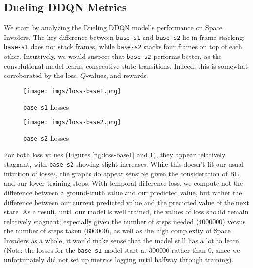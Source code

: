 \documentclass{article} %
\begin{document}
\subsection{Dueling DDQN Metrics}

We start by analyzing the Dueling DDQN model's performance on Space Invaders. The key difference
between \texttt{base-s1} and \texttt{base-s2} lie in frame stacking; \texttt{base-s1} does not stack
frames, while \texttt{base-s2} stacks four frames on top of each other. Intuitively, we would
suspect that \texttt{base-s2} performs better, as the convolutional model learns consecutive state
transitions. Indeed, this is somewhat corroborated by the loss, $Q$-values, and rewards.

\begin{figure}
    \centering
    \begin{minipage}{0.45\textwidth}
        \centering
        \texttt{[image: imgs/loss-base1.png]} %
        \caption{\texttt{base-s1} Losses}
        \label{fig:loss-base1}
    \end{minipage}\hfill
    \begin{minipage}{0.45\textwidth}
        \centering
        \texttt{[image: imgs/loss-base2.png]} %
        \caption{\texttt{base-s2} Losses}
        \label{fig:loss-base2}
    \end{minipage}
\end{figure}

For both loss values (Figures \ref{fig:loss-base1} and \ref{fig:loss-base2}), they appear relatively
stagnant, with \texttt{base-s2} showing slight increases. While this doesn't fit our usual intuition
of losses, the graphs do appear sensible given the consideration of RL and our lower training steps.
With temporal-difference loss, we compute not the difference between a ground-truth value and our
predicted value, but rather the difference between our current predicted value and the predicted
value of the next state. As a result, until our model is well trained, the values of loss should
remain relatively stagnant; especially given the number of steps needed ($4000000$) versus the
number of steps taken ($600000$), as well as the high complexity of Space Invaders as a whole, it
would make sense that the model still has a lot to learn (Note: the losses for the \texttt{base-s1}
model start at $300000$ rather than $0$, since we unfortunately did not set up metrics logging until
halfway through training).
\end{document}
